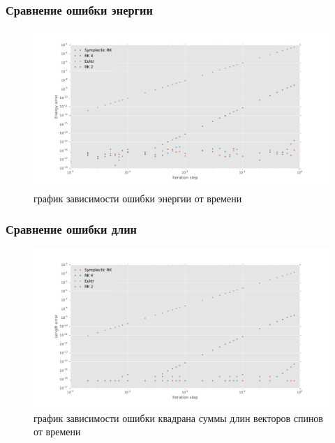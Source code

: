 \documentclass[t]{beamer}
\begin{document}
\begin{frame}
    \frametitle{Сравнение ошибки энергии}
    \begin{figure}[h]
        \centernig
        \includegraphics[width=\textwidth]{errorComparsionEnergy}
        \caption{график зависимости ошибки энергии от времени}
    \end{figure}
\end{frame}

\begin{frame}
    \frametitle{Сравнение ошибки длин}
    \begin{figure}[h]
        \centernig
        \includegraphics[width=\textwidth]{errorComparsionLength}
        \caption{график зависимости ошибки квадрана суммы длин векторов спинов
        от времени}
    \end{figure}
\end{frame}
\end{document}
